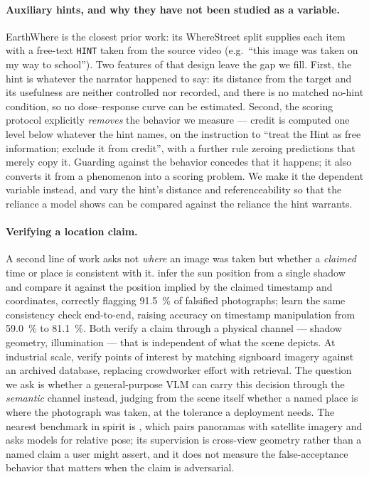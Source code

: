 \documentclass[10pt,a4paper]{article}
\begin{document}
\paragraph{Auxiliary hints, and why they have not been studied as a variable.}
EarthWhere \citep{earthwhere} is the closest prior work: its WhereStreet split
supplies each item with a free-text \texttt{HINT} taken from the source video
(e.g.\ ``this image was taken on my way to school''). Two features of that
design leave the gap we fill. First, the hint is whatever the narrator happened
to say: its distance from the target and its usefulness are neither controlled
nor recorded, and there is no matched no-hint condition, so no dose--response
curve can be estimated. Second, the scoring protocol explicitly \emph{removes}
the behavior we measure --- credit is computed one level below whatever the hint
names, on the instruction to ``treat the Hint as free information; exclude it
from credit'', with a further rule zeroing predictions that merely copy it.
Guarding against the behavior concedes that it happens; it also converts it from
a phenomenon into a scoring problem. We make it the dependent variable instead,
and vary the hint's distance and referenceability so that the reliance a model
shows can be compared against the reliance the hint warrants.

\paragraph{Verifying a location claim.} A second line of work asks not
\emph{where} an image was taken but whether a \emph{claimed} time or place is
consistent with it. \citet{imageguard} infer the sun position from a single
shadow and compare it against the position implied by the claimed timestamp and
coordinates, correctly flagging \SI{91.5}{\percent} of falsified photographs;
\citet{timestamp} learn the same consistency check end-to-end, raising accuracy
on timestamp manipulation from \SI{59.0}{\percent} to \SI{81.1}{\percent}. Both
verify a claim through a physical channel --- shadow geometry, illumination ---
that is independent of what the scene depicts. At industrial scale,
\citet{dumapper} verify points of interest by matching signboard imagery against
an archived database, replacing crowdworker effort with retrieval. The question
we ask is whether a general-purpose VLM can carry this decision through the
\emph{semantic} channel instead, judging from the scene itself whether a named
place is where the photograph was taken, at the tolerance a deployment needs.
The nearest benchmark in spirit is \citet{geoxbench}, which pairs panoramas with
satellite imagery and asks models for relative pose; its supervision is
cross-view geometry rather than a named claim a user might assert, and it does
not measure the false-acceptance behavior that matters when the claim is
adversarial.
\end{document}
